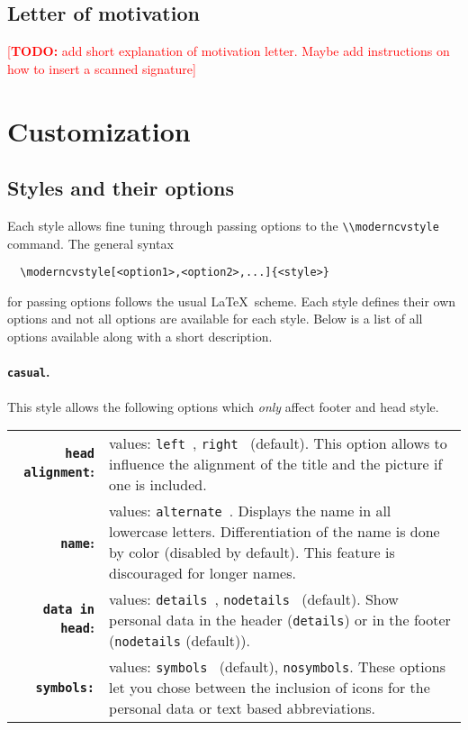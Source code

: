 \documentclass[a4paper,11pt]{article}
\newcommand{\todox}[1]{\textcolor{red}{[\textbf{TODO:} #1]}}
\newcommand{\code}[1]{\lstinline!#1!}
\newcommand{\Code}[1]{\lstinline!#1!~} %
\begin{document}
\subsection{Letter of motivation}

\todox{add short explanation of motivation letter. Maybe add instructions on how to insert a scanned signature}



\section{Customization}
\label{section:customization}
\subsection{Styles and their options}
\label{section:customization:stylesAndOptions}
Each style allows fine tuning through passing options to the \Code{\\moderncvstyle} command. The general syntax
\begin{lstlisting}
  \moderncvstyle[<option1>,<option2>,...]{<style>}
\end{lstlisting}
for passing options follows the usual \LaTeX\ scheme.
Each style defines their own options and not all options are available for each style. 
Below is a list of all options available along with a short description. 

\paragraph{\texttt{casual}.} This style allows the following options which \emph{only} affect footer and head style.\medskip

\begingroup
\renewcommand{\arraystretch}{1.1}
\begin{tabular}{r@{\hspace{2ex}}p{}}
 {\bfseries \code{head alignment}:}  & values: \Code{left}, \Code{right} (default). This option allows to influence the alignment of the title and the picture if one is included.  \\
 {\bfseries \texttt{name}:} & values: \Code{alternate}. Displays the name in all lowercase letters. Differentiation of the name is done by color (disabled by default). This feature is discouraged for  longer names.\\
 {\bfseries \code{data in head}:} & values: \Code{details}, \Code{nodetails} (default). Show personal data in the header (\code{details}) or in the footer (\code{nodetails} (default)). \\
 {\bfseries \code{symbols:}}   & values: \Code{symbols} (default), \code{nosymbols}. These options let you chose between the inclusion of icons for the personal data or text based abbreviations. 
\end{tabular}\medskip
\endgroup
\end{document}
